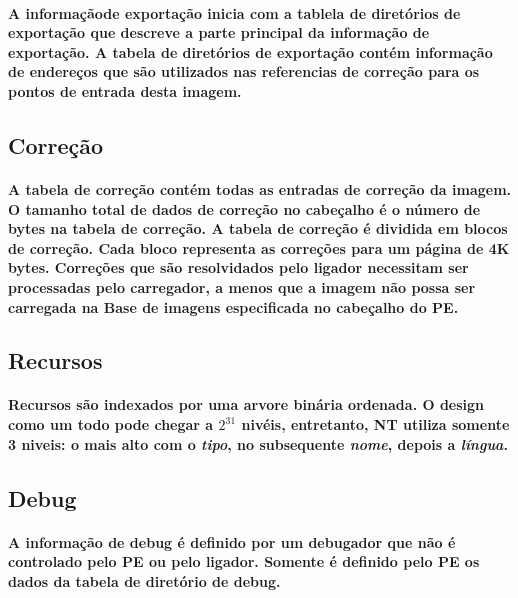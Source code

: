 \paragraph*{A informaçãode exportação inicia com a tablela de diretórios de exportação
que descreve a parte principal da informação de exportação. A tabela
de diretórios de exportação contém informação de endereços que são
utilizados nas referencias de correção para os pontos de entrada desta
imagem.}


\subsection{Correção}


\paragraph*{A tabela de correção contém todas as entradas de correção da imagem.
O tamanho total de dados de correção no cabeçalho é o número de bytes
na tabela de correção. A tabela de correção é dividida em blocos de
correção. Cada bloco representa as correções para um página de 4K
bytes. Correções que são resolvidados pelo ligador necessitam ser
processadas pelo carregador, a menos que a imagem não possa ser carregada
na Base de imagens especificada no cabeçalho do PE.}


\subsection{Recursos}


\paragraph*{Recursos são indexados por uma arvore binária ordenada. O design
como um todo pode chegar a $2^{31}$ nivéis, entretanto, NT utiliza
somente 3 niveis: o mais alto com o \emph{tipo}, no subsequente \emph{nome},
depois a \emph{língua}.}


\subsection{Debug}


\paragraph*{A informação de debug é definido por um debugador que não é controlado
pelo PE ou pelo ligador. Somente é definido pelo PE os dados da tabela
de diretório de debug.}


